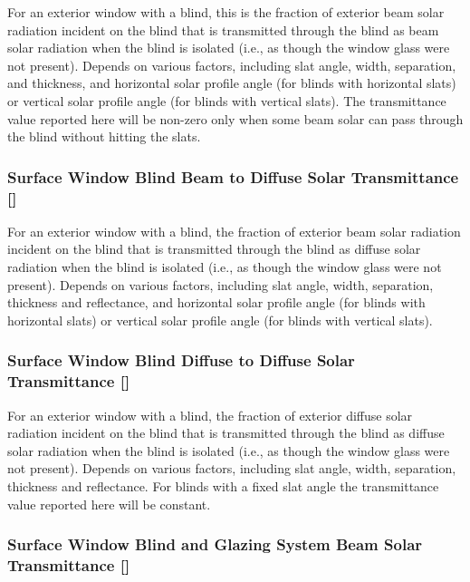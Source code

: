 For an exterior window with a blind, this is the fraction of exterior beam solar radiation incident on the blind that is transmitted through the blind as beam solar radiation when the blind is isolated (i.e., as though the window glass were not present). Depends on various factors, including slat angle, width, separation, and thickness, and horizontal solar profile angle (for blinds with horizontal slats) or vertical solar profile angle (for blinds with vertical slats). The transmittance value reported here will be non-zero only when some beam solar can pass through the blind without hitting the slats.

\subsubsection{Surface Window Blind Beam to Diffuse Solar Transmittance {[]}}\label{surface-window-blind-beam-to-diffuse-solar-transmittance}

For an exterior window with a blind, the fraction of exterior beam solar radiation incident on the blind that is transmitted through the blind as diffuse solar radiation when the blind is isolated (i.e., as though the window glass were not present). Depends on various factors, including slat angle, width, separation, thickness and reflectance, and horizontal solar profile angle (for blinds with horizontal slats) or vertical solar profile angle (for blinds with vertical slats).

\subsubsection{Surface Window Blind Diffuse to Diffuse Solar Transmittance {[]}}\label{surface-window-blind-diffuse-to-diffuse-solar-transmittance}

For an exterior window with a blind, the fraction of exterior diffuse solar radiation incident on the blind that is transmitted through the blind as diffuse solar radiation when the blind is isolated (i.e., as though the window glass were not present). Depends on various factors, including slat angle, width, separation, thickness and reflectance. For blinds with a fixed slat angle the transmittance value reported here will be constant.

\subsubsection{Surface Window Blind and Glazing System Beam Solar Transmittance {[]}}\label{surface-window-blind-and-glazing-system-beam-solar-transmittance}


